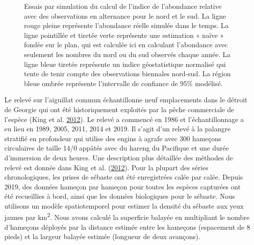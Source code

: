 \documentclass[french,11pt]{book}
\begin{document}
\clearpage
\begin{figure}[htb]

{\centering {} 

}

\caption{Essais par simulation du calcul de l’indice de l’abondance relative avec des observations en alternance pour le nord et le sud. La ligne rouge pleine représente l’abondance réelle simulée dans le temps. La ligne pointillée et tiretée verte représente une estimation « naïve » fondée sur le plan, qui est calculée ici en calculant l’abondance avec seulement les nombres du nord ou du sud observés chaque année. La ligne bleue tiretée représente un indice géostatistique normalisé qui tente de tenir compte des observations biennales nord-sud. La région bleue ombrée représente l’intervalle de confiance de 95\% modélisé.}\label{fig:stich-sim-index}
\end{figure}
\clearpage

\hypertarget{sec:dogfish-index-data}{%
\label{sec:dogfish-index-data}}

Le relevé sur l'aiguillat commun échantillonne neuf emplacements dans le détroit de Georgie qui ont été historiquement exploités par la pêche commerciale de l'espèce (King et al. \protect\hyperlink{ref-king2012}{2012}). Le relevé a commencé en 1986 et l'échantillonnage a eu lieu en 1989, 2005, 2011, 2014 et 2019. Il s'agit d'un relevé à la palangre stratifié en profondeur qui utilise des engins à agrafe avec 300 hameçons circulaires de taille 14/0 appâtés avec du hareng du Pacifique et une durée d'immersion de deux heures. Une description plus détaillée des méthodes de relevé est donnée dans King et al. (\protect\hyperlink{ref-king2012}{2012}). Pour la plupart des séries chronologiques, les prises de sébaste ont été enregistrées calée par calée. Depuis 2019, des données hameçon par hameçon pour toutes les espèces capturées ont été recueillies à bord, ainsi que les données biologiques pour le sébaste. Nous utilisons un modèle spatiotemporel pour estimer la densité du sébaste aux yeux jaunes par km\textsuperscript{2}. Nous avons calculé la superficie balayée en multipliant le nombre d'hameçons déployés par la distance estimée entre les hameçons (espacement de 8 pieds) et la largeur balayée estimée (longueur de deux avançons).
\end{document}
